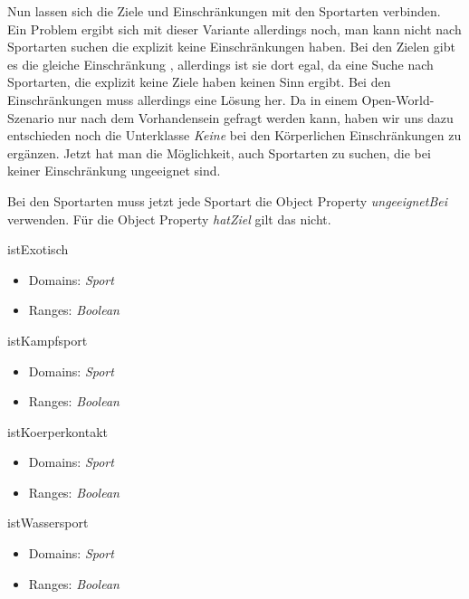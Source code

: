 Nun lassen sich die Ziele und Einschränkungen mit den Sportarten verbinden. Ein Problem ergibt sich mit dieser Variante allerdings noch, man kann nicht nach Sportarten suchen die explizit keine Einschränkungen haben. Bei den Zielen gibt es die gleiche Einschränkung , allerdings ist sie dort egal, da eine Suche nach Sportarten, die explizit keine Ziele haben keinen Sinn ergibt. Bei den Einschränkungen muss allerdings eine Lösung her. Da in einem Open-World-Szenario nur nach dem Vorhandensein gefragt werden kann, haben wir uns dazu entschieden noch die Unterklasse \textit{Keine} bei den Körperlichen Einschränkungen zu ergänzen. Jetzt hat man die Möglichkeit, auch Sportarten zu suchen, die bei keiner Einschränkung ungeeignet sind.

Bei den Sportarten muss jetzt jede Sportart die Object Property \textit{ungeeignetBei} verwenden.   Für die Object Property \textit{hatZiel} gilt das nicht. 

\begin{capitemize}
	\item istExotisch
		\begin{itemize}
			\item Domains: \textit{Sport}
			\item Ranges: \textit{Boolean}
		\end{itemize}
	\item istKampfsport
		\begin{itemize}
			\item Domains: \textit{Sport}
			\item Ranges: \textit{Boolean}
		\end{itemize}
	\item istKoerperkontakt
		\begin{itemize}
			\item Domains: \textit{Sport}
			\item Ranges: \textit{Boolean}
		\end{itemize}
	\item istWassersport
		\begin{itemize}
			\item Domains: \textit{Sport}
			\item Ranges: \textit{Boolean}
		\end{itemize}
\end{capitemize}

